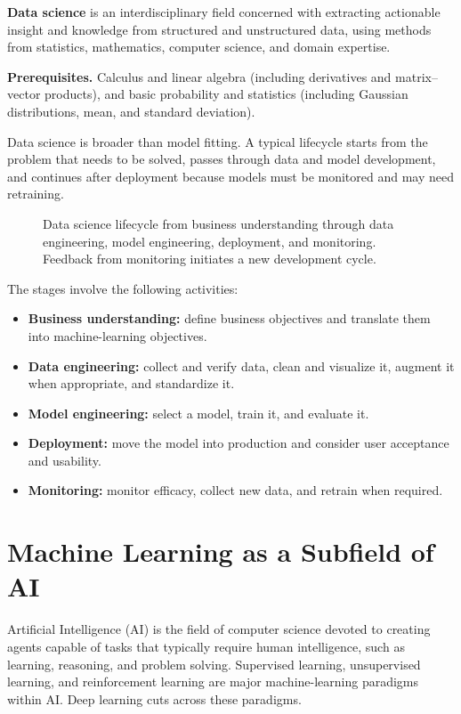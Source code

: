 \documentclass[11pt,a4paper]{article}
\begin{document}
\begin{definitionbox}
\textbf{Data science} is an interdisciplinary field concerned with extracting actionable insight and knowledge from structured and unstructured data, using methods from statistics, mathematics, computer science, and domain expertise.
\end{definitionbox}

\textbf{Prerequisites.} Calculus and linear algebra (including derivatives and matrix--vector products), and basic probability and statistics (including Gaussian distributions, mean, and standard deviation).

Data science is broader than model fitting. A typical lifecycle starts from the problem that needs to be solved, passes through data and model development, and continues after deployment because models must be monitored and may need retraining.

\begin{figure}[htbp]
\centering\lifecyclediagram
\caption{Data science lifecycle from business understanding through data engineering, model engineering, deployment, and monitoring. Feedback from monitoring initiates a new development cycle.}
\end{figure}

The stages involve the following activities:
\begin{itemize}
  \item \textbf{Business understanding:} define business objectives and translate them into machine-learning objectives.
  \item \textbf{Data engineering:} collect and verify data, clean and visualize it, augment it when appropriate, and standardize it.
  \item \textbf{Model engineering:} select a model, train it, and evaluate it.
  \item \textbf{Deployment:} move the model into production and consider user acceptance and usability.
  \item \textbf{Monitoring:} monitor efficacy, collect new data, and retrain when required.
\end{itemize}

\section{Machine Learning as a Subfield of AI}
Artificial Intelligence (AI) is the field of computer science devoted to creating agents capable of tasks that typically require human intelligence, such as learning, reasoning, and problem solving. Supervised learning, unsupervised learning, and reinforcement learning are major machine-learning paradigms within AI. Deep learning cuts across these paradigms.
\end{document}
